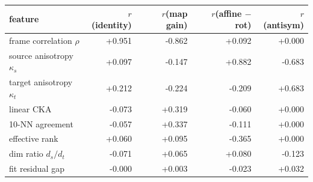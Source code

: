 \begin{tabular}{lrrrr}
\toprule
feature & $r$(identity) & $r$(map gain) & $r$(affine $-$ rot) & $r$(antisym) \\
\midrule
frame correlation $\rho$ & +0.951 & -0.862 & +0.092 & +0.000 \\
source anisotropy $\kappa_s$ & +0.097 & -0.147 & +0.882 & -0.683 \\
target anisotropy $\kappa_t$ & +0.212 & -0.224 & -0.209 & +0.683 \\
linear CKA & -0.073 & +0.319 & -0.060 & +0.000 \\
10-NN agreement & -0.057 & +0.337 & -0.111 & +0.000 \\
effective rank & +0.060 & +0.095 & -0.365 & +0.000 \\
dim ratio $d_s/d_t$ & -0.071 & +0.065 & +0.080 & -0.123 \\
fit residual gap & -0.000 & +0.003 & -0.023 & +0.032 \\
\bottomrule
\end{tabular}